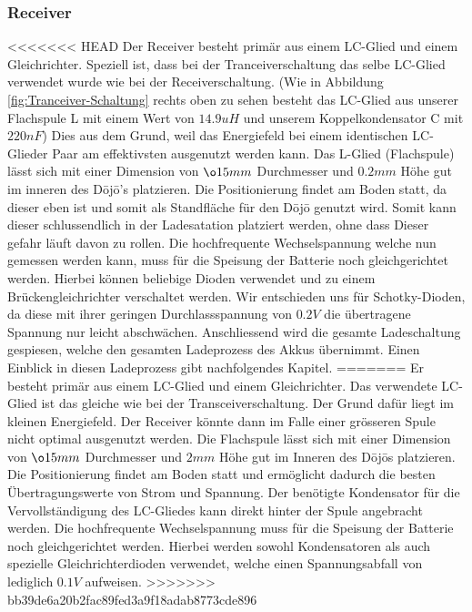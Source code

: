 \subsubsection*{Receiver}
<<<<<<< HEAD
Der Receiver besteht primär aus einem LC-Glied und einem Gleichrichter. Speziell ist, dass bei der Tranceiverschaltung das selbe LC-Glied verwendet wurde wie bei der Receiverschaltung. (Wie in Abbildung \ref{fig:Tranceiver-Schaltung} rechts oben zu sehen besteht das LC-Glied aus unserer Flachspule L mit einem Wert von $14.9uH$ und unserem Koppelkondensator C mit $220nF$)  Dies aus dem Grund, weil das Energiefeld bei einem identischen LC-Glieder Paar am effektivsten ausgenutzt werden kann. Das L-Glied (Flachspule) lässt sich mit einer Dimension von $\o 15mm$ Durchmesser und $0.2mm$ Höhe gut im inneren des Dōjō’s platzieren. Die Positionierung findet am Boden statt, da dieser eben ist und somit als Standfläche für den Dōjō genutzt wird. Somit kann dieser schlussendlich in der Ladesatation platziert werden, ohne dass Dieser gefahr läuft davon zu rollen. Die hochfrequente Wechselspannung welche nun gemessen werden kann, muss für die Speisung der Batterie noch gleichgerichtet werden. Hierbei können beliebige Dioden verwendet  und zu einem Brückengleichrichter verschaltet werden. Wir entschieden uns für Schotky-Dioden, da diese mit ihrer geringen Durchlassspannung von $0.2V$ die übertragene Spannung nur leicht abschwächen. Anschliessend wird die gesamte Ladeschaltung gespiesen, welche den gesamten Ladeprozess des Akkus übernimmt. Einen Einblick in diesen Ladeprozess gibt nachfolgendes Kapitel.
=======
Er besteht primär aus einem LC-Glied und einem Gleichrichter. Das verwendete LC-Glied ist das gleiche wie bei der Transceiverschaltung. Der Grund dafür liegt im kleinen Energiefeld. Der Receiver könnte dann im Falle einer grösseren Spule nicht optimal ausgenutzt werden. Die Flachspule lässt sich mit einer Dimension von $\o 15mm$ Durchmesser und $2mm$ Höhe gut im Inneren des Dōjōs platzieren. Die Positionierung findet am Boden statt und ermöglicht dadurch die besten Übertragungswerte von Strom und Spannung. Der benötigte Kondensator für die Vervollständigung des LC-Gliedes kann direkt hinter der Spule angebracht werden. Die hochfrequente Wechselspannung muss für die Speisung der Batterie noch gleichgerichtet werden. Hierbei werden sowohl Kondensatoren als auch spezielle Gleichrichterdioden verwendet, welche einen Spannungsabfall von lediglich $0.1V$ aufweisen.
>>>>>>> bb39de6a20b2fac89fed3a9f18adab8773cde896
